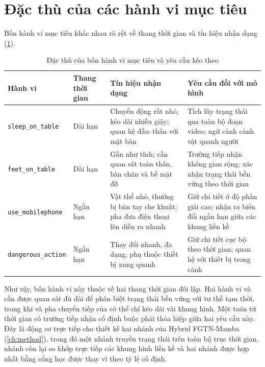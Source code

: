 \section{Đặc thù của các hành vi mục tiêu}
\label{sec:behaviours}

Bốn hành vi mục tiêu khác nhau rõ rệt về thang thời gian và tín hiệu nhận dạng (\cref{tab:behaviours}).

\begin{table}[htbp]
\centering
\caption{Đặc thù của bốn hành vi mục tiêu và yêu cầu kéo theo}
\label{tab:behaviours}
\small
\begin{tabularx}{\textwidth}{>{\raggedright\arraybackslash}p{4.3cm}>{\raggedright\arraybackslash}p{1.6cm}XX}
\toprule
\textbf{Hành vi} & \textbf{Thang thời gian} & \textbf{Tín hiệu nhận dạng} & \textbf{Yêu cầu đối với mô hình}\\
\midrule
\texttt{sleep\_on\_table} & Dài hạn & Chuyển động rất nhỏ, kéo dài nhiều giây; quan hệ đầu--thân với mặt bàn & Tích lũy trạng thái qua toàn bộ đoạn video; ngữ cảnh cảnh vật quanh người\\
\texttt{feet\_on\_table} & Dài hạn & Gần như tĩnh; cần quan sát toàn thân, bàn chân và bề mặt đỡ & Trường tiếp nhận không gian rộng; xác nhận trạng thái bền vững theo thời gian\\
\texttt{use\_mobilephone} & Ngắn hạn & Vật thể nhỏ, thường bị bàn tay che khuất; pha đưa điện thoại lên diễn ra nhanh & Giữ chi tiết ở độ phân giải cao; nhận ra biến đổi ngắn hạn giữa các khung liền kề\\
\texttt{dangerous\_action} & Ngắn hạn & Thay đổi nhanh, đa dạng, phụ thuộc thiết bị xung quanh & Giữ chi tiết cục bộ theo thời gian; quan hệ với thiết bị trong cảnh\\
\bottomrule
\end{tabularx}
\end{table}

Như vậy, bốn hành vi này thuộc về hai thang thời gian đối lập. Hai hành vi  và  cần được quan sát đủ dài để phân biệt trạng thái bền vững với tư thế tạm thời, trong khi  và pha chuyển tiếp của  có thể chỉ kéo dài vài khung hình. Một toán tử thời gian có trường tiếp nhận cố định buộc phải thỏa hiệp giữa hai yêu cầu này. Đây là động cơ trực tiếp cho thiết kế hai nhánh của Hybrid FGTN-Mamba (\cref{ch:method}), trong đó một nhánh truyền trạng thái trên toàn bộ trục thời gian, nhánh còn lại so khớp trực tiếp các khung hình liền kề và hai nhánh được hợp nhất bằng cổng học được thay vì theo tỷ lệ cố định.

